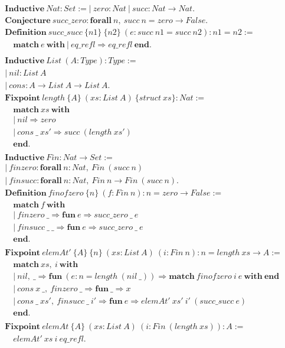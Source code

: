 \begin{align*}
&\mathbf{Inductive}\ Nat : Set :=
   |\ zero : Nat\ |\ succ : Nat \rightarrow Nat.\\
&\mathbf{Conjecture}\ succ\_zero : \mathbf{forall}\ n,\ succ\ n = zero \rightarrow
   False.\\
&\mathbf{Definition}\ succ\_succ\ \{n1\}\ \{n2\}\ (e : succ\ n1 = succ\ n2) :
   n1 = n2 :=\\
&\quad\mathbf{match}\ e\ \mathbf{with}\ |\ eq\_refl \Rightarrow
   eq\_refl\ \mathbf{end}.\\
\\
&\mathbf{Inductive}\ List\ (A : Type) : Type :=\\
&|\ nil : List\ A\\
&|\ cons : A \rightarrow List\ A \rightarrow List\ A.\\
&\mathbf{Fixpoint}\ length\ \{A\}\ (xs : List\ A)\ \{struct\ xs\} : Nat :=\\
&\quad\mathbf{match}\ xs\ \mathbf{with}\\
&\quad|\ nil \Rightarrow zero\\
&\quad|\ cons\ \_\ xs' \Rightarrow succ\ (length\ xs')\\
&\quad\mathbf{end}.\\
\\
&\mathbf{Inductive}\ Fin : Nat \rightarrow Set :=\\
&|\ finzero : \mathbf{forall}\ n : Nat,\ Fin\ (succ\ n)\\
&|\ finsucc : \mathbf{forall}\ n : Nat,\ Fin\ n \rightarrow Fin\ (succ\ n).\\
&\mathbf{Definition}\ finofzero\ \{n\}\ (f : Fin\ n) : n = zero \rightarrow False :=\\
&\quad\mathbf{match}\ f\ \mathbf{with}\\
&\quad|\ finzero\ \_ \Rightarrow \mathbf{fun}\ e \Rightarrow succ\_zero\ \_\ e\\
&\quad|\ finsucc\ \_\ \_ \Rightarrow \mathbf{fun}\ e \Rightarrow succ\_zero\ \_\ e\\
&\quad\mathbf{end}.\\
\\
&\mathbf{Fixpoint}\ elemAt'\ \{A\}\ \{n\}\ (xs : List\ A)\ (i : Fin\ n) :
   n = length\ xs \rightarrow A :=\\
&\quad\mathbf{match}\ xs,\ i\ \mathbf{with}\\
&\quad|\ nil,\ \_ \Rightarrow \mathbf{fun}\ (e : n = length\ (nil\ \_))
   \Rightarrow \mathbf{match}\ finofzero\ i\ e\ \mathbf{with\ end}\\
&\quad|\ cons\ x\ \_,\ finzero\ \_ \Rightarrow \mathbf{fun}\ \_ \Rightarrow x\\
&\quad|\ cons\ \_\ xs',\ finsucc\ \_\ i' \Rightarrow \mathbf{fun}\ e \Rightarrow
   elemAt'\ xs'\ i'\ (succ\_succ\ e)\\
&\quad\mathbf{end}.\\
\\
&\mathbf{Fixpoint}\ elemAt\ \{A\}\ (xs : List\ A)\ (i : Fin\ (length\ xs)) : A :=\\
&\quad elemAt'\ xs\ i\ eq\_refl.
\end{align*}

